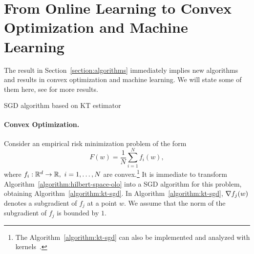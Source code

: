 \section{From Online Learning to Convex Optimization and Machine Learning}
\label{section:applications}

The result in Section~\ref{section:algorithms} immediately implies new
algorithms and results in convex optimization and machine learning. We will state some of them here, see
\cite{Orabona-2014} for more results.

\begin{algorithm}[t]
\caption{SGD algorithm based on KT estimator \label{algorithm:kt-sgd}}
\begin{algorithmic}[1]
{
\ENDFOR
{}
}
\end{algorithmic}
\end{algorithm}

\paragraph{Convex Optimization.}
Consider an empirical risk minimization problem of the form
%
\begin{equation}
\label{equation:objective-function}
F(w) = \frac{1}{N} \sum_{i=1}^N f_i(w),
\end{equation}
%
where $f_i:\mathbb{R}^d \to \mathbb{R}, \ i=1,\ldots,N$ are convex.\footnote{The Algorithm~\ref{algorithm:kt-sgd} can also be
implemented and analyzed with kernels~\citep{Orabona-2014}.} It is immediate to
transform Algorithm~\ref{algorithm:hilbert-space-olo} into a \ac{SGD} algorithm
for this problem, obtaining Algorithm~\ref{algorithm:kt-sgd}.
In Algorithm~\ref{algorithm:kt-sgd}, $\nabla f_j(w)$
denotes a subgradient of $f_j$ at a point $w$.  We assume that the
norm of the subgradient of $f_j$ is bounded by $1$.

